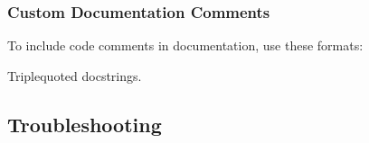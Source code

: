 \documentclass[letterpaper,10pt,english]{sphinxmanual}
\begin{document}
\subsubsection{Custom Documentation Comments}
\label{\detokenize{documentation_workflow:custom-documentation-comments}}
\sphinxAtStartPar
To include code comments in documentation, use these formats:
\begin{description}
\sphinxAtStartPar
Triple\sphinxhyphen{}quoted docstrings.

\begin{sphinxVerbatim}[commandchars=\\\{\}]
\end{sphinxVerbatim}

\begin{sphinxVerbatim}[commandchars=\\\{\}]
\end{sphinxVerbatim}

\begin{sphinxVerbatim}[commandchars=\\\{\}]
\end{sphinxVerbatim}

\end{description}


\subsection{Troubleshooting}
\label{\detokenize{documentation_workflow:troubleshooting}}
\end{document}
